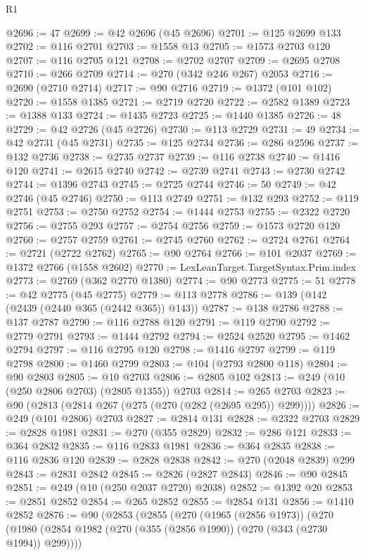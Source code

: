 \begin{lexlean}{R1}
\begin{coremodule}
@2696 := 47
@2699 := @42 @2696 (@45 @2696)
@2701 := @125 @2699 @133
@2702 := @116 @2701
@2703 := @1558 @13
@2705 := @1573 @2703 @120
@2707 := @116 @2705 @121
@2708 := @2702 @2707
@2709 := @2695 @2708
@2710 := @266 @2709
@2714 := @270 (@342 @246 @267) @2053
@2716 := @2690 (@2710 @2714)
@2717 := @90 @2716
@2719 := @1372 (@101 @102)
@2720 := @1558 @1385
@2721 := @2719 @2720
@2722 := @2582 @1389
@2723 := @1388 @133
@2724 := @1435 @2723
@2725 := @1440 @1385
@2726 := 48
@2729 := @42 @2726 (@45 @2726)
@2730 := @113 @2729
@2731 := 49
@2734 := @42 @2731 (@45 @2731)
@2735 := @125 @2734
@2736 := @286 @2596
@2737 := @132 @2736
@2738 := @2735 @2737
@2739 := @116 @2738
@2740 := @1416 @120
@2741 := @2615 @2740
@2742 := @2739 @2741
@2743 := @2730 @2742
@2744 := @1396 @2743
@2745 := @2725 @2744
@2746 := 50
@2749 := @42 @2746 (@45 @2746)
@2750 := @113 @2749
@2751 := @132 @293
@2752 := @119 @2751
@2753 := @2750 @2752
@2754 := @1444 @2753
@2755 := @2322 @2720
@2756 := @2755 @293
@2757 := @2754 @2756
@2759 := @1573 @2720 @120
@2760 := @2757 @2759
@2761 := @2745 @2760
@2762 := @2724 @2761
@2764 := @2721 (@2722 @2762)
@2765 := @90 @2764
@2766 := @101 @2037
@2769 := @1372 @2766 (@1558 @2602)
@2770 := LexLeanTarget.TargetSyntax.Prim.index
@2773 := @2769 (@362 @2770 @1380)
@2774 := @90 @2773
@2775 := 51
@2778 := @42 @2775 (@45 @2775)
@2779 := @113 @2778
@2786 := @139 (@142 (@2439 (@2440 @365 (@2442 @365)) @143))
@2787 := @138 @2786
@2788 := @137 @2787
@2790 := @116 @2788 @120
@2791 := @119 @2790
@2792 := @2779 @2791
@2793 := @1444 @2792
@2794 := @2524 @2520
@2795 := @1462 @2794
@2797 := @116 @2795 @120
@2798 := @1416 @2797
@2799 := @119 @2798
@2800 := @1460 @2799
@2803 := @104 (@2793 @2800 @118)
@2804 := @90 @2803
@2805 := @10 @2703
@2806 := @2805 @102
@2813 := @249 (@10 (@250 @2806 @2703) (@2805 @1355)) @2703
@2814 := @265 @2703
@2823 := @90 (@2813 (@2814 @267 (@275 (@270 (@282 (@2695 @295)) @299))))
@2826 := @249 (@101 @2806) @2703
@2827 := @2814 @131
@2828 := @2322 @2703
@2829 := @2828 @1981
@2831 := @270 (@355 @2829)
@2832 := @286 @121
@2833 := @364 @2832
@2835 := @116 @2833 @1981
@2836 := @364 @2835
@2838 := @116 @2836 @120
@2839 := @2828 @2838
@2842 := @270 (@2048 @2839) @299
@2843 := @2831 @2842
@2845 := @2826 (@2827 @2843)
@2846 := @90 @2845
@2851 := @249 (@10 (@250 @2037 @2720) @2038)
@2852 := @1392 @20
@2853 := @2851 @2852
@2854 := @265 @2852
@2855 := @2854 @131
@2856 := @1410 @2852
@2876 := @90
    (@2853
      (@2855
        (@270
          (@1965 (@2856 @1973))
          (@270
            (@1980 (@2854 @1982 (@270 (@355 (@2856 @1990)) (@270 (@343 (@2730 @1994)) @299))))

\end{coremodule}
\end{lexlean}
